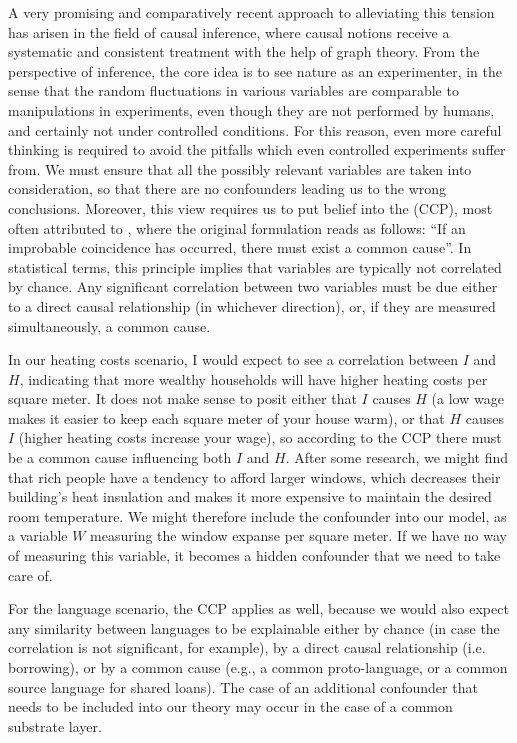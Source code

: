 A very promising and comparatively recent approach to alleviating this tension has arisen in the field of causal inference, where causal notions receive a systematic and consistent treatment with the help of graph theory. From the perspective of inference, the core idea is to see nature as an experimenter, in the sense that the random fluctuations in various variables are comparable to manipulations in experiments, even though they are not performed by humans, and certainly not under controlled conditions. For this reason, even more careful thinking is required to avoid the pitfalls which even controlled experiments suffer from. We must ensure that all the possibly relevant variables are taken into consideration, so that there are no confounders leading us to the wrong conclusions. Moreover, this view requires us to put belief into the  (CCP), most often attributed to \citet[Ch. 19]{reichenbach1956}, where the original formulation reads as follows: ``If an improbable coincidence has occurred, there must exist a common cause''. In statistical terms, this principle implies that variables are typically not correlated by chance. Any significant correlation between two variables must be due either to a direct causal relationship (in whichever direction), or, if they are measured simultaneously, a common cause.

In our heating costs scenario, I would expect to see a correlation between $I$ and $H$, indicating that more wealthy households will have higher heating costs per square meter. It does not make sense to posit either that $I$ causes $H$ (a low wage makes it easier to keep each square meter of your house warm), or that $H$ causes $I$ (higher heating costs increase your wage), so according to the CCP there must be a common cause influencing both $I$ and $H$. After some research, we might find that rich people have a tendency to afford larger windows, which decreases their building's heat insulation and makes it more expensive to maintain the desired room temperature. We might therefore include the confounder into our model, as a variable $W$ measuring the window expanse per square meter. If we have no way of measuring this variable, it becomes a hidden confounder that we need to take care of.

For the language scenario, the CCP applies as well, because we would also expect any similarity between languages to be explainable either by chance (in case the correlation is not significant, for example), by a direct causal relationship (i.e. borrowing), or by a common cause (e.g., a common proto-language, or a common source language for shared loans). The case of an additional confounder that needs to be included into our theory may occur in the case of a common substrate layer.

